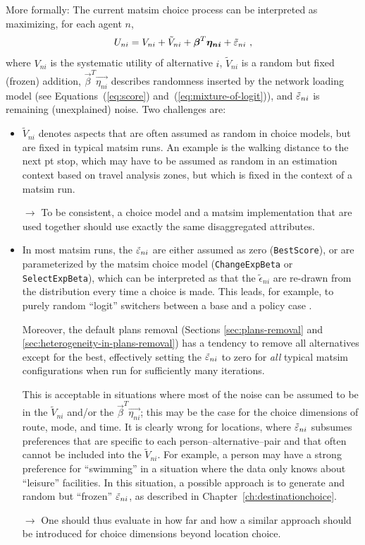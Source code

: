 More formally: 
%
The current \gls{matsim} choice process can be interpreted as maximizing, for each agent $n$, 
\[
U_{ni} = V_{ni} + \tilde V_{ni} + \boldsymbol{\beta}^T \boldsymbol{\eta_{ni}} + \tilde {\varepsilon}_{ni} \ ,
\]
where 
%
$V_{ni}$ is the systematic utility of alternative $i$, 
%
$\tilde V_{ni}$ is a random but fixed (frozen) addition, 
%
$\vec{\beta}^T \vec{\eta_{ni}}$ describes randomness inserted by the network loading model (see Equations~(\ref{eq:score}) and~(\ref{eq:mixture-of-logit})), and $\tilde {\varepsilon}_{ni}$ is remaining (unexplained) noise.
%
Two challenges are:
\begin{itemize}

\item $\tilde V_{ni}$ denotes aspects that are often assumed as random in choice models, but are fixed in typical \gls{matsim} runs.  An example is the walking distance to the next \gls{pt} stop, which may have to be assumed as random in an estimation context based on travel analysis zones, but which is fixed in the context of a \gls{matsim} run.

$\to$ To be consistent, a choice model and a \gls{matsim} implementation that are used together should use exactly the same disaggregated attributes.

\item In most \gls{matsim} runs, the $\tilde{\varepsilon}_{ni}$ are either assumed as zero (\lstinline{BestScore}), or are parameterized by the \gls{matsim} choice model (\lstinline{ChangeExpBeta} or \lstinline{SelectExpBeta}), which can be interpreted as that the $\tilde\epsilon_{ni}$ are re-drawn from the distribution every time a choice is made.  This leads, for example, to purely random ``logit'' switchers between a base and a policy case \citep[e.g.][]{GretherEtAl2010TrbIncomeInTRR}.

Moreover, the default plans removal (Sections \ref{sec:plans-removal} and \ref{sec:heterogeneity-in-plans-removal}) has a tendency to remove all alternatives except for the best, effectively setting the $\tilde{\varepsilon}_{ni}$ to zero for \emph{all} typical \gls{matsim} configurations when run for sufficiently many iterations.

This is acceptable in situations where most of the noise can be assumed to be in the $\tilde V_{ni}$ and/or the $\vec{\beta}^T \vec{\eta_{ni}}$; this may be the case for the choice dimensions of route, mode, and time.  It is clearly wrong for locations, where $\tilde{\varepsilon}_{ni}$ subsumes preferences that are specific to each person--alternative--pair and that often cannot be included into the $\tilde V_{ni}$.  For example, a person may have a strong preference for ``swimming'' in a situation where the data only knows about ``leisure'' facilities.  In this situation, a possible approach is to generate and random but ``frozen'' $\tilde{\varepsilon}_{ni}$, as described in Chapter~\ref{ch:destinationchoice}.

$\to$ One should thus evaluate in how far and how a similar approach should be introduced for choice dimensions beyond location choice.

\end{itemize}

